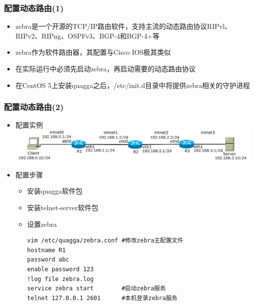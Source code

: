 \documentclass[xcolor=svgnames,presentation]{beamer}
\begin{document}
\begin{frame}
\frametitle{配置动态路由(1)}
\label{sec-3-5}
\begin{itemize}

\item zebra是一个开源的TCP/IP路由软件，支持主流的动态路由协议RIPvl、RIPv2、RIPng、OSPFv3、BGP-4和BGP-4+等
\label{sec-3-5-1}%

\item zebra作为软件路由器，其配置与Cisco IOS极其类似
\label{sec-3-5-2}%

\item 在实际运行中必须先启动zebra，再启动需要的动态路由协议
\label{sec-3-5-3}%

\item 在CentOS 5上安装quagga之后，/etc/init.d目录中将提供zebra相关的守护进程
\label{sec-3-5-4}%
\end{itemize} %
\end{frame}
\begin{frame}[fragile]
\frametitle{配置动态路由(2)}
\label{sec-3-6}
\begin{itemize}

\item 配置实例\\
\label{sec-3-6-1}%
\includegraphics[width=.9\linewidth]{img/router2.pdf}

\item 配置步骤
\label{sec-3-6-2}%
\begin{itemize}

\item 安装quagga软件包
\label{sec-3-6-2-1}%

\item 安装telnet-server软件包
\label{sec-3-6-2-2}%

\item 设置zebra\\
\label{sec-3-6-2-3}%
\begin{verbatim}
vim /etc/quagga/zebra.conf #修改zebra主配置文件
hostname R1
password abc
enable password 123
!log file zebra.log
service zebra start        #启动zebra服务
telnet 127.0.0.1 2601      #本机登录zebra服务
\end{verbatim}
\end{itemize} %
\end{itemize} %
\end{frame}
\end{document}
